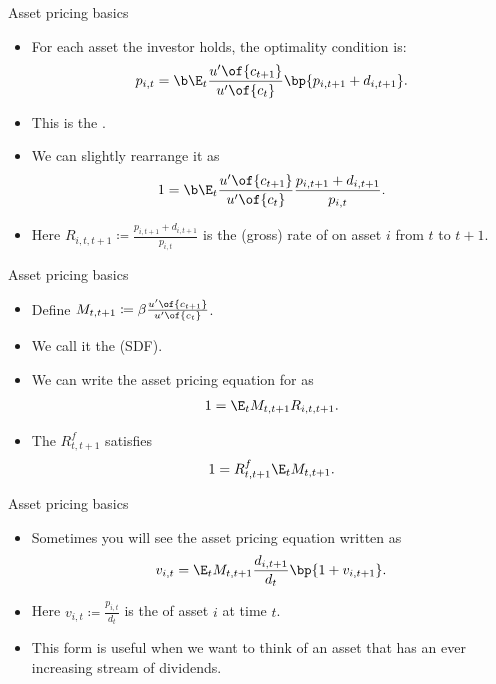 \documentclass[11pt,xcolor={dvipsnames},aspectratio=159,hyperref={pdftex,pdfpagemode=UseNone,hidelinks,pdfdisplaydoctitle=true},usepdftitle=false]{beamer}
\begin{document}
\begin{frame}{Asset pricing basics}  
    \begin{itemize}
        \item For each asset the investor holds, the optimality condition is: 
\begin{align*}
        p_{i,t}  = \b \E_t \frac{u^\prime\of{c_{t+1}}}{u^\prime\of{c_t}} \bp{ p_{i,t+1} + d_{i,t+1}}.    
\end{align*}
\item This is the .
        \item We can slightly rearrange it as 
        \begin{align*}
            1  = \b \E_t \frac{u^\prime\of{c_{t+1}}}{u^\prime\of{c_t}} \frac{ p_{i,t+1} + d_{i,t+1}}{p_{i,t}}.    
    \end{align*}
    \item Here $R_{i,t,t+1}\coloneq \frac{ p_{i,t+1} + d_{i,t+1}}{p_{i,t}}$ is the (gross) rate of  on asset $i$ from $t$ to $t+1$.
    \end{itemize}
\end{frame}

\begin{frame}{Asset pricing basics}  
    \begin{itemize}
        \item Define $M_{t,t+1}\coloneq \beta \frac{u^\prime\of{c_{t+1}}}{u^\prime\of{c_t}}$.
        \item We call it the  (SDF).
\item We can write the asset pricing equation for  as \begin{align*}
    1 = \E_t M_{t,t+1} R_{i,t,t+1}.
\end{align*}
\item The  $R^f_{t,t+1}$ satisfies \begin{align*} 
    1 = R^f_{t,t+1} \E_t M_{t,t+1}.
\end{align*}
        
\end{itemize}
\end{frame}


\begin{frame}{Asset pricing basics}  
    \begin{itemize}
        \item Sometimes you will see the asset pricing equation written as
        \begin{align*}
            v_{i,t} = \E_t M_{t,t+1} \frac{d_{i,t+1}}{d_t} \bp{1+v_{i,t+1}}.
        \end{align*}
        \item Here $v_{i,t}\coloneq \frac{p_{i,t}}{d_t}$ is the  of asset $i$ at time $t$.
        \item This form is useful when we want to think of an asset that has an ever increasing stream of dividends.
\end{itemize}
\end{frame}
\end{document}

